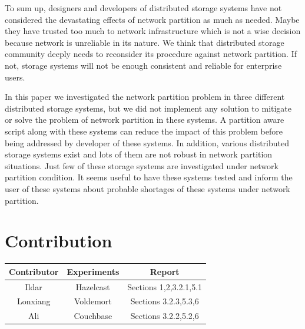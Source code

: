 \documentclass[a4paper]{article}
\begin{document}
To sum up, designers and developers of distributed storage systems have not considered the devastating effects of network partition as much as needed.
Maybe they have trusted too much to network infrastructure which is not a wise decision because network is unreliable in its nature.
We think that distributed storage community deeply needs to reconsider its procedure against network partition.
If not, storage systems will not be enough consistent and reliable for enterprise users.

In this paper we investigated the network partition problem in three different distributed storage systems, but we did not implement any solution to mitigate or solve the problem of network partition in these systems. 
A partition aware script along with these systems can reduce the impact of this problem before being addressed by developer of these systems.
In addition, various distributed storage systems exist and lots of them are not robust in network partition situations.
Just few of these storage systems are investigated under network partition condition.
It seems useful to have these systems tested and inform the user of these systems about probable shortages of these systems under network partition.


\section*{Contribution}

\begin{table}[h]
	\centering
	\begin{tabular}{|c|c|c|}
		\hline
		\rowcolor{light-gray} \textbf{Contributor} & \textbf{Experiments} & \textbf{Report} \\ \hline
		Ildar & Hazelcast & Sections 1,2,3.2.1,5.1 \\ \hline
		Lonxiang & Voldemort & Sections 3.2.3,5.3,6  \\ \hline
		Ali & Couchbase & Sections 3.2.2,5.2,6 \\ \hline
	\end{tabular}
\end{table}

\printbibliography
\end{document}
